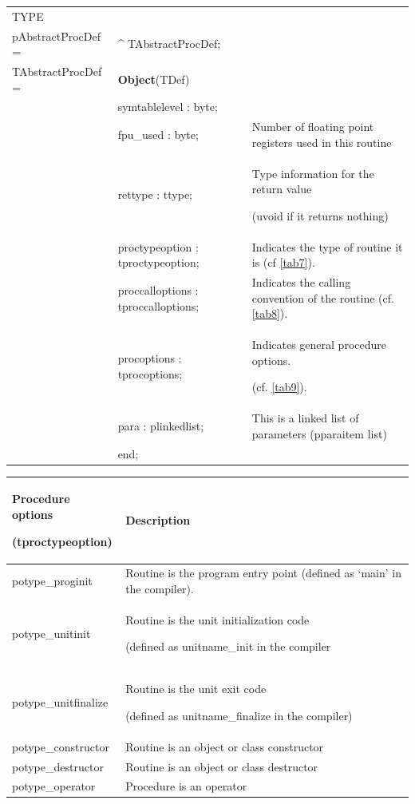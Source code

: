 \documentclass [12pt]{article}
\begin{document}
\begin{tabular*}{6.5in}{|l@{\extracolsep{\fill}}lp{5.5cm}|}
\hline
\textsf{TYPE}& & \\
\xspace pAbstractProcDef = & \^{}  TAbstractProcDef; & \\
\xspace \textsf{TAbstractProcDef} = & \textbf{Object}(TDef) & \\
&\textsf{symtablelevel : byte;}&  \\
&\textsf{fpu{\_}used : byte;}& 
	Number of floating point registers used in this routine  \\
&\textsf{rettype : ttype;}& 
	Type information for the return value \par (uvoid if it returns nothing) \\
&\textsf{proctypeoption : tproctypeoption;} & 
	Indicates the type of routine it is (cf \ref{tab7}). \\
&\textsf{proccalloptions : tproccalloptions;} & 
	Indicates the calling convention of the routine (cf. \ref{tab8}). \\
&\textsf{procoptions : tprocoptions;}& 
	Indicates general procedure options.  \par (cf. \ref{tab9}). \\
&\textsf{para : plinkedlist;}& 
	This is a linked list of parameters (pparaitem list) \\
&\textsf{end;}&  \\
\hline
\end{tabular*}

\begin{longtable}{|l|p{10cm}|}
\hline
Procedure options  \par (tproctypeoption)& Description \\
\hline
\endhead
\hline
\endfoot
\textsf{potype{\_}proginit}& 
	Routine is the program entry point (defined as `\textsf{main}' in
	the compiler). \\
\textsf{potype{\_}unitinit}& 
	Routine is the unit initialization code \par (defined as
	unitname\textsf{{\_}init} in the compiler \\
\textsf{potype{\_}unitfinalize}& 
	Routine is the unit exit code \par (defined as
	unitname\textsf{{\_}finalize} in the compiler) \\
\textsf{potype{\_}constructor}& 
	Routine is an object or class constructor \\
\textsf{potype{\_}destructor}& 
	Routine is an object or class destructor \\
\textsf{potype{\_}operator}& 
	Procedure is an operator \\
\end{longtable}
\end{document}
